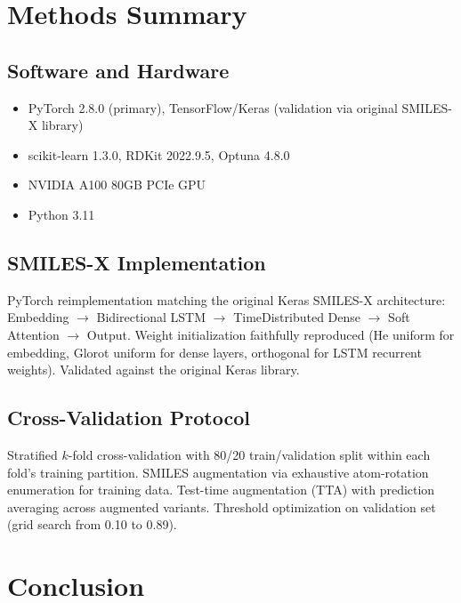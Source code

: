 \documentclass[11pt,a4paper]{article}
\begin{document}
\section{Methods Summary}

\subsection{Software and Hardware}
\begin{itemize}[nosep]
    \item PyTorch 2.8.0 (primary), TensorFlow/Keras (validation via original SMILES-X library)
    \item scikit-learn 1.3.0, RDKit 2022.9.5, Optuna 4.8.0
    \item NVIDIA A100 80GB PCIe GPU
    \item Python 3.11
\end{itemize}

\subsection{SMILES-X Implementation}
PyTorch reimplementation matching the original Keras SMILES-X architecture: Embedding $\to$ Bidirectional LSTM $\to$ TimeDistributed Dense $\to$ Soft Attention $\to$ Output. Weight initialization faithfully reproduced (He uniform for embedding, Glorot uniform for dense layers, orthogonal for LSTM recurrent weights). Validated against the original Keras library.

\subsection{Cross-Validation Protocol}
Stratified $k$-fold cross-validation with 80/20 train/validation split within each fold's training partition. SMILES augmentation via exhaustive atom-rotation enumeration for training data. Test-time augmentation (TTA) with prediction averaging across augmented variants. Threshold optimization on validation set (grid search from 0.10 to 0.89).

\section{Conclusion}
\end{document}
